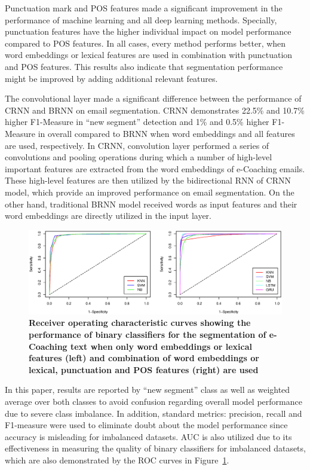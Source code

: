 \documentclass{amia}
\begin{document}
Punctuation mark and POS features made a significant improvement in the performance of machine learning and all deep learning methods. Specially, punctuation features have the higher individual impact on model performance compared to POS features. In all cases, every method performs better, when word embeddings or lexical features are used in combination with punctuation and POS features. This results also indicate that segmentation performance might be improved by adding additional relevant features. 

The convolutional layer made a significant difference between the performance of CRNN and BRNN on email segmentation. CRNN demonstrates 22.5\% and 10.7\% higher F1-Measure in ``new segment'' detection and 1\% and 0.5\% higher F1-Measure in overall compared to BRNN when word embeddings and all features are used, respectively. In CRNN, convolution layer performed a series of convolutions and pooling operations during which a number of high-level important features are extracted from the word embeddings of e-Coaching emails. These high-level features are then utilized by the bidirectional RNN of CRNN model, which provide an improved performance on email segmentation. On the other hand, traditional BRNN model received words as input features and their word embeddings are directly utilized in the input layer.  

\begin{figure}[!htb]
    \centering
    \includegraphics[width=1.0\textwidth]{figures/roc-curves.eps}
    \caption{\textbf{Receiver operating characteristic curves showing the performance of binary classifiers for the segmentation of e-Coaching text when only word embeddings or lexical features (left) and combination of word embeddings or lexical, punctuation and POS features (right) are used}}
    \label{fig:roc-curves}
\end{figure}

In this paper, results are reported by ``new segment'' class as well as weighted average over both classes to avoid confusion regarding overall model performance due to severe class imbalance. In addition, standard metrics: precision, recall and F1-measure were used to eliminate doubt about the model performance since accuracy is misleading for imbalanced datasets. AUC is also utilized due to its effectiveness in measuring the quality of binary classifiers for imbalanced datasets,\cite{hu2015kernelized} which are also demonstrated by the ROC curves in Figure~\ref{fig:roc-curves}. 
\end{document}

